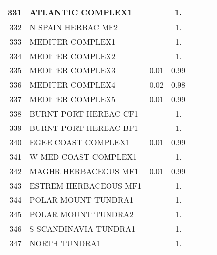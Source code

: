 {{\begin{tabular}{||r|l||c|c|c|c|c||}
 \hline
 \hline
         331  & ATLANTIC COMPLEX1                                            &       &  1.   &       &       \\
 \hline
         332  & N SPAIN HERBAC MF2                                           &       &  1.   &       &       \\
 \hline
         333  & MEDITER COMPLEX1                                             &       &  1.   &       &       \\
 \hline
         334  & MEDITER COMPLEX2                                             &       &  1.   &       &       \\
 \hline
         335  & MEDITER COMPLEX3                                             &  0.01 &  0.99 &       &       \\
 \hline
         336  & MEDITER COMPLEX4                                             &  0.02 &  0.98 &       &       \\
 \hline
         337  & MEDITER COMPLEX5                                             &  0.01 &  0.99 &       &       \\
 \hline
         338  & BURNT PORT HERBAC CF1                                        &       &  1.   &       &       \\
 \hline
         339  & BURNT PORT HERBAC BF1                                        &       &  1.   &       &       \\
 \hline
         340  & EGEE COAST COMPLEX1                                          &  0.01 &  0.99 &       &       \\
 \hline
         341  & W MED COAST COMPLEX1                                         &       &  1.   &       &       \\
 \hline
         342  & MAGHR HERBACEOUS MF1                                         &  0.01 &  0.99 &       &       \\
 \hline
         343  & ESTREM HERBACEOUS MF1                                        &       &  1.   &       &       \\
 \hline
         344  & POLAR MOUNT TUNDRA1                                          &       &  1.   &       &       \\
 \hline
         345  & POLAR MOUNT TUNDRA2                                          &       &  1.   &       &       \\
 \hline
         346  & S SCANDINAVIA TUNDRA1                                        &       &  1.   &       &       \\
 \hline
         347  & NORTH TUNDRA1                                                &       &  1.   &       &       \\

\end{tabular}}}
